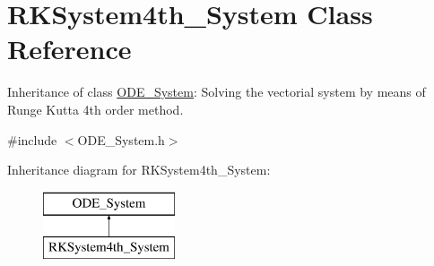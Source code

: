\hypertarget{class_r_k_system4th___system}{}\section{R\+K\+System4th\+\_\+\+System Class Reference}
\label{class_r_k_system4th___system}


Inheritance of class \mbox{\hyperlink{class_o_d_e___system}{O\+D\+E\+\_\+\+System}}\+: Solving the vectorial system by means of Runge Kutta 4th order method.  




{\ttfamily \#include $<$O\+D\+E\+\_\+\+System.\+h$>$}

Inheritance diagram for R\+K\+System4th\+\_\+\+System\+:\begin{figure}[H]
\begin{center}
\leavevmode
\includegraphics[height=2.000000cm]{class_r_k_system4th___system}
\end{center}
\end{figure}
